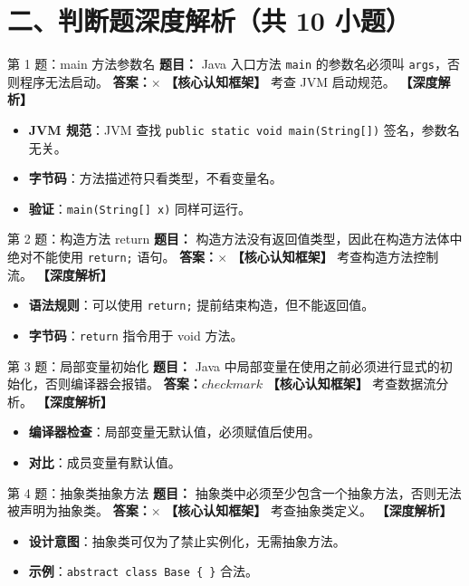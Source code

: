 ﻿\documentclass[12pt, a4paper]{ctexart}
\begin{document}
\section{二、判断题深度解析（共 10 小题）}

\begin{bluebox}{第 1 题：main 方法参数名}
	\textbf{题目：} Java 入口方法 \texttt{main} 的参数名必须叫 \texttt{args}，否则程序无法启动。
	\textbf{答案：$\times$}
	\textbf{【核心认知框架】} 考查 JVM 启动规范。
	\textbf{【深度解析】}
	\begin{itemize}[leftmargin=*, nosep]
		\item \textbf{JVM 规范}：JVM 查找 \texttt{public static void main(String[])} 签名，参数名无关。
		\item \textbf{字节码}：方法描述符只看类型，不看变量名。
		\item \textbf{验证}：\texttt{main(String[] x)} 同样可运行。
	\end{itemize}
\end{bluebox}

\begin{bluebox}{第 2 题：构造方法 return}
	\textbf{题目：} 构造方法没有返回值类型，因此在构造方法体中绝对不能使用 \texttt{return;} 语句。
	\textbf{答案：$\times$}
	\textbf{【核心认知框架】} 考查构造方法控制流。
	\textbf{【深度解析】}
	\begin{itemize}[leftmargin=*, nosep]
		\item \textbf{语法规则}：可以使用 \texttt{return;} 提前结束构造，但不能返回值。
		\item \textbf{字节码}：\texttt{return} 指令用于 void 方法。
	\end{itemize}
\end{bluebox}

\begin{bluebox}{第 3 题：局部变量初始化}
	\textbf{题目：} Java 中局部变量在使用之前必须进行显式的初始化，否则编译器会报错。
	\textbf{答案：$checkmark$}
	\textbf{【核心认知框架】} 考查数据流分析。
	\textbf{【深度解析】}
	\begin{itemize}[leftmargin=*, nosep]
		\item \textbf{编译器检查}：局部变量无默认值，必须赋值后使用。
		\item \textbf{对比}：成员变量有默认值。
	\end{itemize}
\end{bluebox}

\begin{bluebox}{第 4 题：抽象类抽象方法}
	\textbf{题目：} 抽象类中必须至少包含一个抽象方法，否则无法被声明为抽象类。
	\textbf{答案：$\times$}
	\textbf{【核心认知框架】} 考查抽象类定义。
	\textbf{【深度解析】}
	\begin{itemize}[leftmargin=*, nosep]
		\item \textbf{设计意图}：抽象类可仅为了禁止实例化，无需抽象方法。
		\item \textbf{示例}：\texttt{abstract class Base \{ \}} 合法。
	\end{itemize}
\end{bluebox}
\end{document}
